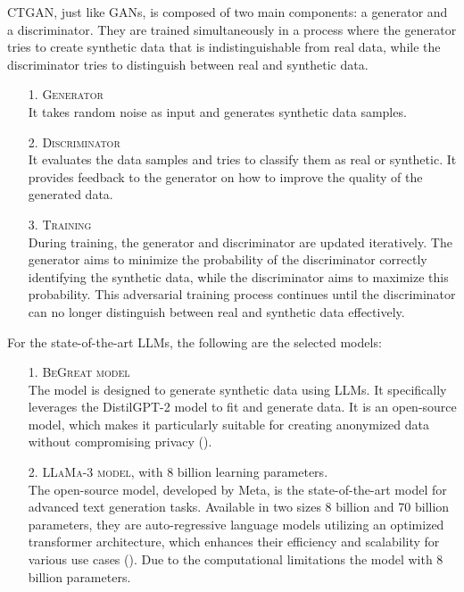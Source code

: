 CTGAN, just like GANs, is composed of two main components: a generator and a discriminator. They are trained simultaneously in a process where the generator tries to create synthetic data that is indistinguishable from real data, while the discriminator tries to distinguish between real and synthetic data.

\begin{itemize}
    \item[1.] \textsc{Generator}\\
    It takes random noise as input and generates synthetic data samples.

    \item[2.] \textsc{Discriminator}\\
    It evaluates the data samples and tries to classify them as real or synthetic. It provides feedback to the generator on how to improve the quality of the generated data.

    \item[3.] \textsc{Training} \\
    During training, the generator and discriminator are updated iteratively. The generator aims to minimize the probability of the discriminator correctly identifying the synthetic data, while the discriminator aims to maximize this probability. This adversarial training process continues until the discriminator can no longer distinguish between real and synthetic data effectively.
    
\end{itemize}


\vspace{1cm}

\noindent For the state-of-the-art LLMs, the following are the selected models:

\begin{itemize}
    \item[1.] \textsc{BeGreat model} \\
    The model is designed to generate synthetic data using LLMs. It specifically leverages the DistilGPT-2 model to fit and generate data. It is an open-source model, which makes it particularly suitable for creating anonymized data without compromising privacy (\cite{great_library_2024}).



    
    \item[2.] \textsc{LLaMa-3 model}, with 8 billion learning parameters.\\
    The open-source model, developed by Meta, is the state-of-the-art model for advanced text generation tasks. Available in two sizes 8 billion and 70 billion parameters, they are auto-regressive language models utilizing an optimized transformer architecture, which enhances their efficiency and scalability for various use cases (\cite{meta2024llama3, huggingface2024llama3}). Due to the computational limitations the model with 8 billion parameters.

\end{itemize}

